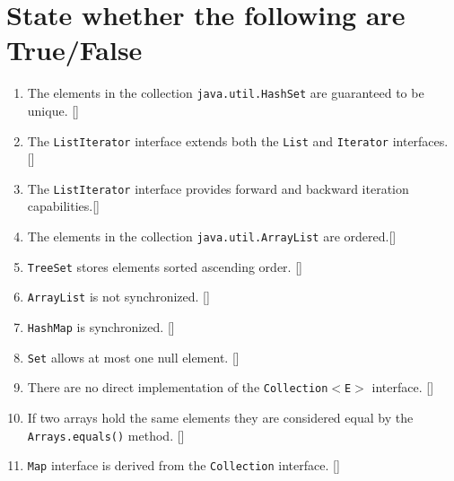 \documentclass[11pt,a4paper]{article}
\begin{document}
\section*{State whether the following are True/False}
\begin{enumerate}\itemsep2pt
    \item The elements in the collection \texttt{java.util.HashSet} are guaranteed to be unique. [\hspace{1cm}]
    \item The \texttt{ListIterator} interface extends both the \texttt{List} and \texttt{Iterator} interfaces. [\hspace{1cm}]
    \item The \texttt{ListIterator} interface provides forward and backward iteration capabilities.[\hspace{1cm}]
    \item The elements in the collection \texttt{java.util.ArrayList} are ordered.[\hspace{1cm}]
    \item \texttt{TreeSet} stores elements sorted ascending order. [\hspace{1cm}]
    \item \texttt{ArrayList} is not synchronized. [\hspace{1cm}]
    \item \texttt{HashMap} is synchronized. [\hspace{1cm}]
    \item \texttt{Set} allows at most one null element. [\hspace{1cm}]
    \item There are no direct implementation of the \texttt{Collection$<$E$>$} interface. [\hspace{1cm}]
    \item If two arrays hold the same elements they are considered equal by the \texttt{Arrays.equals()} method. [\hspace{1cm}]
    \item \texttt{Map} interface is derived from the \texttt{Collection} interface. [\hspace{1cm}]
\end{enumerate}
\end{document}

